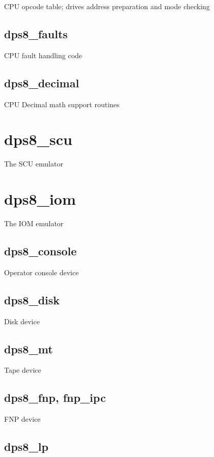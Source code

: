 \documentclass[notitlepage]{report}
\begin{document}
CPU opcode table; drives address preparation and mode checking

\subsection{dps8\_faults}

CPU fault handling code

\subsection{dps8\_decimal}

CPU Decimal math support routines

\section{dps8\_scu}

The SCU emulator

\section{dps8\_iom}

The IOM emulator

\subsection{dps8\_console}

Operator console device

\subsection{dps8\_disk}

Disk device

\subsection{dps8\_mt}

Tape device

\subsection{dps8\_fnp, fnp\_ipc}

FNP device

\subsection{dps8\_lp}
\end{document}
